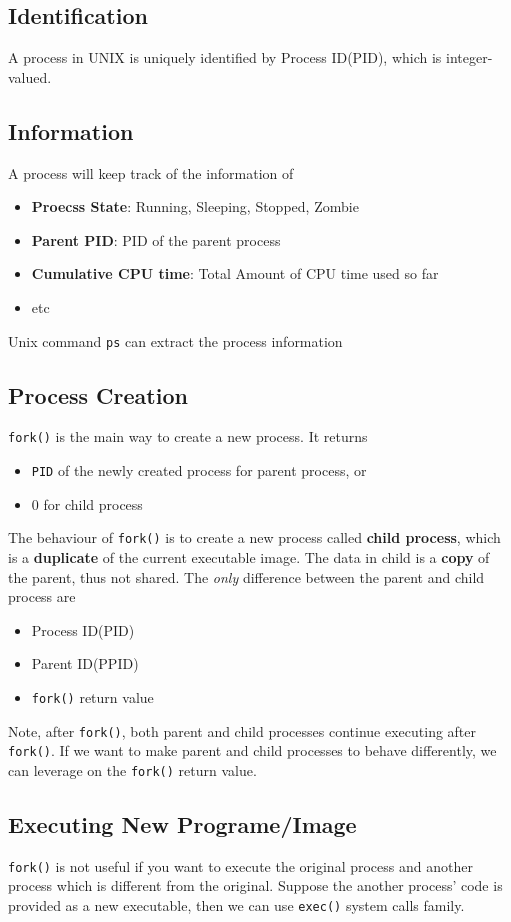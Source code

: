 \documentclass[12pt]{article}
\theoremstyle{definition}
\begin{document}
\subsection{Identification}
A process in UNIX is uniquely identified by Process ID(PID), which is integer-valued.
\subsection{Information}
A process will keep track of the information of
\begin{itemize}
  \item \textbf{Proecss State}: Running, Sleeping, Stopped, Zombie
  \item \textbf{Parent PID}: PID of the parent process
  \item \textbf{Cumulative CPU time}: Total Amount of CPU time used so far
  \item etc
\end{itemize}
Unix command \texttt{ps} can extract the process information
\subsection{Process Creation}
\texttt{fork()} is the main way to create a new process. It returns
\begin{itemize}
  \item \texttt{PID} of the newly created process for parent process, or
  \item $0$ for child process
\end{itemize}
The behaviour of \texttt{fork()} is to create a new process called \textbf{child process}, which is a \textbf{duplicate} of the current executable image. The data in child is a \textbf{copy} of the parent, thus not shared. The \textit{only} difference between the parent and child process are
\begin{itemize}
\item Process ID(PID)
\item Parent ID(PPID)
\item \texttt{fork()} return value
\end{itemize}
Note, after \texttt{fork()}, both parent and child processes continue executing after \texttt{fork()}. If we want to make parent and child processes to behave differently, we can leverage on the \texttt{fork()} return value.
\subsection{Executing New Programe/Image}
\texttt{fork()} is not useful if you want to execute the original process and another process which is different from the original. Suppose the another process' code is provided as a new executable, then we can use \texttt{exec()} system calls family.\\
\end{document}
